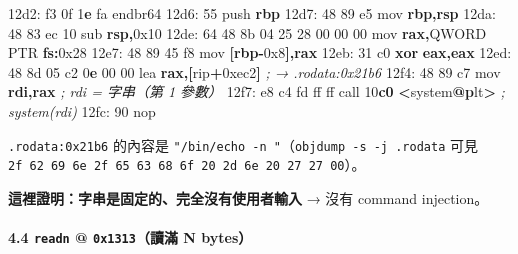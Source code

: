 \documentclass[10pt,a4paper]{article}
\newenvironment{Shaded}{\begin{snugshade}}{\end{snugshade}}
\newcommand{\BaseNTok}[1]{\textcolor[rgb]{0.00,0.00,0.81}{#1}}
\newcommand{\BuiltInTok}[1]{#1}
\newcommand{\CommentTok}[1]{\textcolor[rgb]{0.56,0.35,0.01}{\textit{#1}}}
\newcommand{\DataTypeTok}[1]{\textcolor[rgb]{0.13,0.29,0.53}{#1}}
\newcommand{\DecValTok}[1]{\textcolor[rgb]{0.00,0.00,0.81}{#1}}
\newcommand{\ErrorTok}[1]{\textcolor[rgb]{0.64,0.00,0.00}{\textbf{#1}}}
\newcommand{\FloatTok}[1]{\textcolor[rgb]{0.00,0.00,0.81}{#1}}
\newcommand{\FunctionTok}[1]{\textcolor[rgb]{0.13,0.29,0.53}{\textbf{#1}}}
\newcommand{\KeywordTok}[1]{\textcolor[rgb]{0.13,0.29,0.53}{\textbf{#1}}}
\newcommand{\NormalTok}[1]{#1}
\newcommand{\OperatorTok}[1]{\textcolor[rgb]{0.81,0.36,0.00}{\textbf{#1}}}
\renewenvironment{Shaded}{%
  \def\FrameCommand{\fboxsep=3.2pt\colorbox{shadecolor}}%
  \MakeFramed{\advance\hsize-\width\FrameRestore\small}%
}{%
  \endMakeFramed
}
\begin{document}
\begin{Shaded}
\begin{Highlighting}[]
\NormalTok{12d2: f3 }\FloatTok{0}\BaseNTok{f} \DecValTok{1}\ErrorTok{e}\NormalTok{ fa            endbr64}
\NormalTok{12d6: 55                     }\BuiltInTok{push}   \KeywordTok{rbp}
\NormalTok{12d7: 48 89 e5               mov    }\KeywordTok{rbp}\OperatorTok{,}\KeywordTok{rsp}
\NormalTok{12da: 48 83 ec }\DecValTok{10}\NormalTok{            sub    }\KeywordTok{rsp}\OperatorTok{,}\BaseNTok{0x10}
\NormalTok{12de: 64 48 8b 04 25 28 00 00 00   }\BuiltInTok{mov} \KeywordTok{rax}\OperatorTok{,}\DataTypeTok{QWORD} \DataTypeTok{PTR} \KeywordTok{fs}\OperatorTok{:}\BaseNTok{0x28}
\NormalTok{12e7: 48 89 45 f8            mov    }\OperatorTok{[}\KeywordTok{rbp}\OperatorTok{{-}}\BaseNTok{0x8}\OperatorTok{],}\KeywordTok{rax}
\NormalTok{12eb: 31 c0                  }\OperatorTok{xor}    \KeywordTok{eax}\OperatorTok{,}\KeywordTok{eax}
\NormalTok{12ed: 48 8d 05 c2 }\DecValTok{0}\ErrorTok{e} \DecValTok{00} \DecValTok{00}\NormalTok{   lea    }\KeywordTok{rax}\OperatorTok{,[}\NormalTok{rip}\OperatorTok{+}\BaseNTok{0xec2}\OperatorTok{]}       \CommentTok{; → .rodata:0x21b6}
\NormalTok{12f4: 48 89 c7               mov    }\KeywordTok{rdi}\OperatorTok{,}\KeywordTok{rax}               \CommentTok{; rdi = 字串（第 1 參數）}
\NormalTok{12f7: e8 c4 fd ff ff         call   }\DecValTok{10}\ErrorTok{c0} \OperatorTok{\textless{}}\NormalTok{system}\FunctionTok{@}\ErrorTok{p}\NormalTok{lt}\OperatorTok{\textgreater{}}     \CommentTok{; system(rdi)}
\NormalTok{12fc: 90                     }\BuiltInTok{nop}
\end{Highlighting}
\end{Shaded}

\texttt{.\allowbreak{}rodata:\allowbreak{}0x21b6} 的內容是
\texttt{"/\allowbreak{}bin/\allowbreak{}echo\ \allowbreak{}-\allowbreak{}n\ \allowbreak{}\textquotesingle{}\allowbreak{}\textquotesingle{}\allowbreak{}"}（\texttt{objdump\ \allowbreak{}-\allowbreak{}s\ \allowbreak{}-\allowbreak{}j\ \allowbreak{}.\allowbreak{}rodata}
可見
\texttt{2f\ \allowbreak{}62\ \allowbreak{}69\ \allowbreak{}6e\ \allowbreak{}2f\ \allowbreak{}65\ \allowbreak{}63\ \allowbreak{}68\ \allowbreak{}6f\ \allowbreak{}20\ \allowbreak{}2d\ \allowbreak{}6e\ \allowbreak{}20\ \allowbreak{}27\ \allowbreak{}27\ \allowbreak{}00}）。

\textbf{這裡證明：字串是固定的、完全沒有使用者輸入} → 沒有 command
injection。

\paragraph{\texorpdfstring{4.4 \texttt{readn} @ \texttt{0x1313}（讀滿 N
bytes）}{4.4 readn @ 0x1313（讀滿 N bytes）}}\label{readn-0x1313ux8b80ux6eff-n-bytes}
\end{document}

